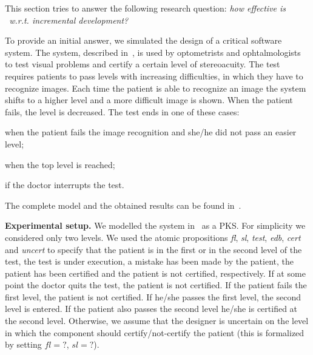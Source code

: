 This section tries to answer the following research question: \emph{how effective is \NAME\ w.r.t. incremental development?}

To provide an initial answer, we simulated the design of a critical software system. 
The system, described in~\cite{arcaini2015formal}, is used by optometrists and ophtalmologists to test visual problems and certify a certain level of stereoacuity.
The test requires patients to pass levels with increasing difficulties, in which they have to recognize images.
Each time the patient is able to recognize an image the system shifts to a higher level and a more difficult image is shown. 
When the patient fails, the level is decreased.
The test ends in one of these cases:
\begin{enumerate*}
\item when the patient fails the image recognition and she/he did not pass an easier level;
\item when the top level is reached;
\item if the doctor interrupts the test.
\end{enumerate*}
The complete model and the obtained results can be found in~\cite{bernasconi2017example}.
 

\textbf{Experimental setup.}
We modelled the system in~\cite{arcaini2015formal} as a PKS. 
For simplicity we considered only two levels. 
We used the atomic propositions \textit{fl}, \textit{sl}, \textit{test}, \textit{edb}, \textit{cert} and \textit{uncert} to specify that 
the patient is in the first or in the second level of the test, 
the test is under execution,
a mistake has been made by the patient, 
the patient has been certified and the patient is not certified, 
respectively.
If at some point the doctor quits the test, the patient is not certified.
If the patient fails the first level, the patient is not certified.
If he/she passes the first level, the second level is entered. 
If the patient also passes the second level he/she is certified at the second level.
Otherwise, we assume that the designer is uncertain on the level in which the component should certify/not-certify the patient (this is formalized by setting $fl=?$, $sl=?$).

